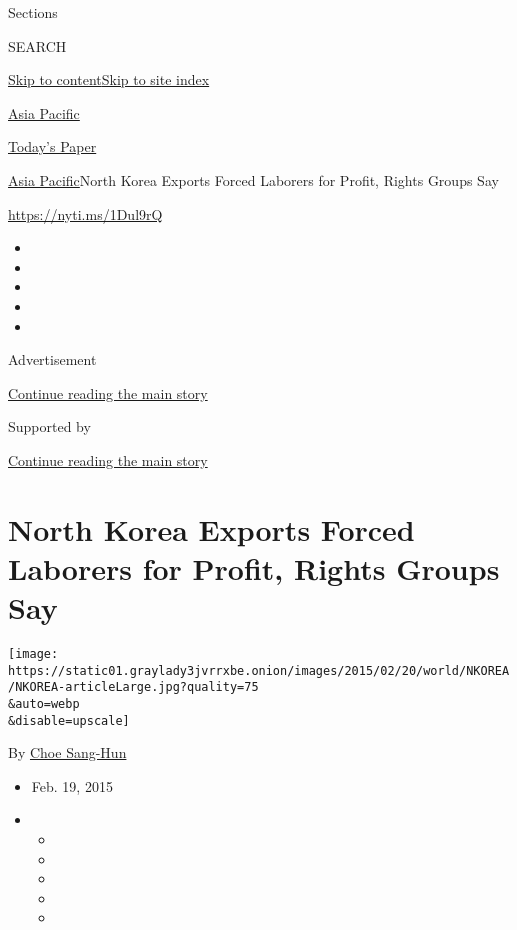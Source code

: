 Sections

SEARCH

\protect\hyperlink{site-content}{Skip to
content}\protect\hyperlink{site-index}{Skip to site index}

\href{https://www.nytimes3xbfgragh.onion/section/world/asia}{Asia
Pacific}

\href{https://myaccount.nytimes3xbfgragh.onion/auth/login?response_type=cookie\&client_id=vi}{}

\href{https://www.nytimes3xbfgragh.onion/section/todayspaper}{Today's
Paper}

\href{/section/world/asia}{Asia Pacific}\textbar{}North Korea Exports
Forced Laborers for Profit, Rights Groups Say

\url{https://nyti.ms/1Dul9rQ}

\begin{itemize}
\item
\item
\item
\item
\item
\end{itemize}

Advertisement

\protect\hyperlink{after-top}{Continue reading the main story}

Supported by

\protect\hyperlink{after-sponsor}{Continue reading the main story}

\hypertarget{north-korea-exports-forced-laborers-for-profit-rights-groups-say}{%
\section{North Korea Exports Forced Laborers for Profit, Rights Groups
Say}\label{north-korea-exports-forced-laborers-for-profit-rights-groups-say}}

\texttt{[image: https://static01.graylady3jvrrxbe.onion/images/2015/02/20/world/NKOREA/NKOREA-articleLarge.jpg?quality=75\\\&auto=webp\\\&disable=upscale]}

By \href{http://www.nytimes3xbfgragh.onion/by/choe-sang-hun}{Choe
Sang-Hun}

\begin{itemize}
\item
  Feb. 19, 2015
\item
  \begin{itemize}
  \item
  \item
  \item
  \item
  \item
  \end{itemize}
\end{itemize}

